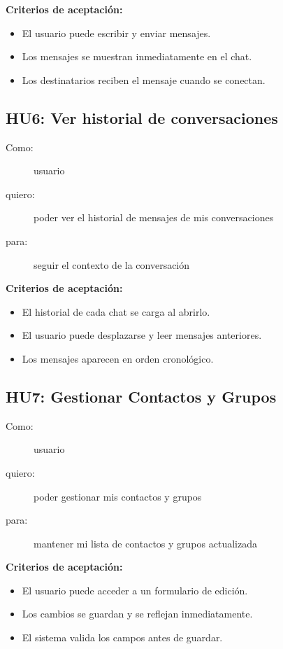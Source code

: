 \textbf{Criterios de aceptación:}
\begin{itemize}
    \item El usuario puede escribir y enviar mensajes.
    \item Los mensajes se muestran inmediatamente en el chat.
    \item Los destinatarios reciben el mensaje cuando se conectan.
\end{itemize}

\subsection*{HU6: Ver historial de conversaciones}
\begin{description}
  \item[Como:] usuario
  \item[quiero:] poder ver el historial de mensajes de mis conversaciones
  \item[para:] seguir el contexto de la conversación
\end{description}

\textbf{Criterios de aceptación:}
\begin{itemize}
    \item El historial de cada chat se carga al abrirlo.
    \item El usuario puede desplazarse y leer mensajes anteriores.
    \item Los mensajes aparecen en orden cronológico.
\end{itemize}

\subsection*{HU7: Gestionar Contactos y Grupos}
\begin{description}
  \item[Como:] usuario
  \item[quiero:] poder gestionar mis contactos y grupos
  \item[para:] mantener mi lista de contactos y grupos actualizada
\end{description}

\textbf{Criterios de aceptación:}
\begin{itemize}
    \item El usuario puede acceder a un formulario de edición.
    \item Los cambios se guardan y se reflejan inmediatamente.
    \item El sistema valida los campos antes de guardar.
\end{itemize}

